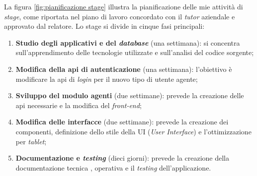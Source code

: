La figura \ref{fig:pianificazione stage} illustra la pianificazione delle mie attività di \textit{stage},
come riportata nel piano di lavoro concordato con il \textit{tutor} aziendale e approvato dal relatore.
Lo stage si divide in cinque fasi principali:
\begin{enumerate}
      \item \textbf{Studio degli applicativi e del \textit{database}} (una settimana): si concentra sull'apprendimento
            delle tecnologie utilizzate e sull'analisi del codice sorgente;
      \item \textbf{Modifica della \gls{api} di autenticazione} (una settimana): l'obiettivo è modificare la \gls{api} di 
           \textit{login} per il nuovo tipo di utente agente;
      \item \textbf{Sviluppo del modulo agenti} (due settimane): prevede la creazione delle \gls{api} necessarie
            e la modifica del \textit{front-end};
      \item \textbf{Modifica delle interfacce} (due settimane): prevede la creazione dei componenti, definizione
            dello stile della UI (\textit{User Interface}) e l'ottimizzazione per \textit{tablet};
      \item \textbf{Documentazione e \textit{testing}} (dieci giorni): prevede la creazione della documentazione tecnica 
            , operativa e il \textit{testing} dell'applicazione.
\end{enumerate}
